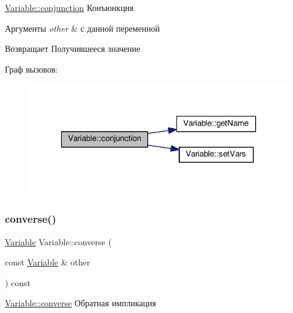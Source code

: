 \hyperlink{class_variable_a3072441748b17a105aea1485911bb489}{Variable\+::conjunction} Конъюнкция 


\begin{DoxyParams}{Аргументы}
{\em other} & с данной переменной \\
\hline
\end{DoxyParams}
\begin{DoxyReturn}{Возвращает}
Получившееся значение 
\end{DoxyReturn}
Граф вызовов\+:\nopagebreak
\begin{figure}[H]
\begin{center}
\leavevmode
\includegraphics[width=321pt]{class_variable_a3072441748b17a105aea1485911bb489_cgraph}
\end{center}
\end{figure}
\mbox{\label{class_variable_adb62912a5e9433289191879e6bb7d580}} 
\subsubsection{\texorpdfstring{converse()}{converse()}}
{\footnotesize\ttfamily \hyperlink{class_variable}{Variable} Variable\+::converse (\begin{DoxyParamCaption}\item[{const \hyperlink{class_variable}{Variable} \&}]{other }\end{DoxyParamCaption}) const}



\hyperlink{class_variable_adb62912a5e9433289191879e6bb7d580}{Variable\+::converse} Обратная импликация 


